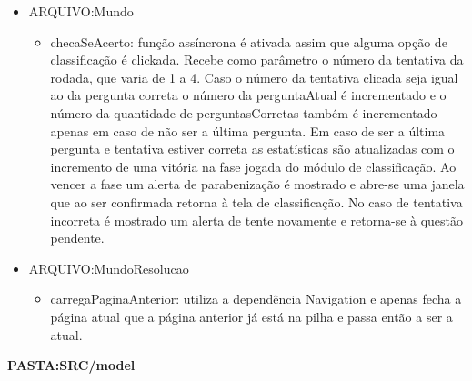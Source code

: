 \begin{itemize}
\item ARQUIVO:Mundo
	\begin{itemize}
	\item checaSeAcerto: função assíncrona é ativada assim que alguma opção de classificação é clickada. Recebe como parâmetro o número da tentativa da rodada, que varia de 1 a 4. Caso o número da tentativa clicada seja igual ao da pergunta correta o número da perguntaAtual é incrementado e o número da quantidade de perguntasCorretas também é incrementado apenas em caso de não ser a última pergunta. Em caso de ser a última pergunta e tentativa estiver correta as estatísticas são atualizadas com o incremento de uma vitória na fase jogada do módulo de classificação. Ao vencer a fase um alerta de parabenização é mostrado e abre-se uma janela que ao ser confirmada retorna à tela de classificação. No caso de tentativa incorreta é mostrado um alerta de tente novamente e retorna-se à questão pendente. 
	\end{itemize}
\end{itemize}

\begin{itemize}
\item ARQUIVO:MundoResolucao
	\begin{itemize}
	\item carregaPaginaAnterior: utiliza a dependência Navigation e apenas fecha a página atual que a página anterior já está na pilha e passa então a ser a atual.
	\end{itemize}
\end{itemize}


\textbf{PASTA:SRC/model}


